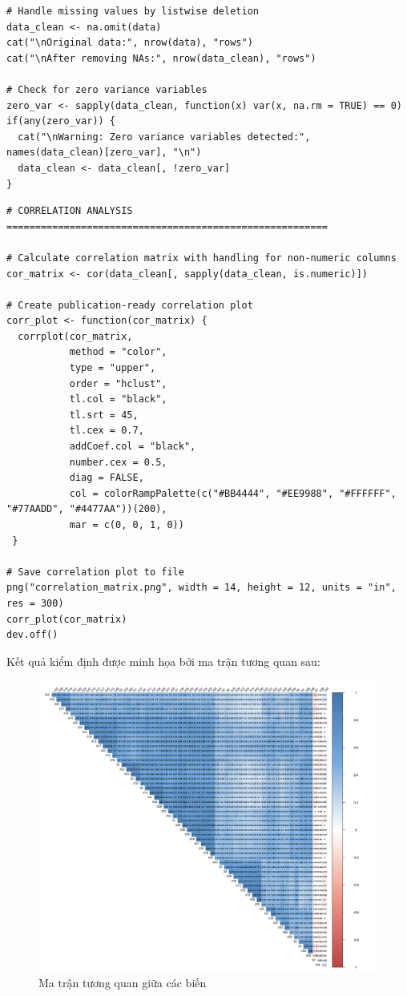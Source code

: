 \begin{lstlisting}[style=Rstyle, caption={Đọc dữ liệu vào để tiến hành phân tích dữ liệu}]
# Handle missing values by listwise deletion
data_clean <- na.omit(data)
cat("\nOriginal data:", nrow(data), "rows")
cat("\nAfter removing NAs:", nrow(data_clean), "rows")

# Check for zero variance variables
zero_var <- sapply(data_clean, function(x) var(x, na.rm = TRUE) == 0)
if(any(zero_var)) {
  cat("\nWarning: Zero variance variables detected:", names(data_clean)[zero_var], "\n")
  data_clean <- data_clean[, !zero_var]
}
\end{lstlisting}

\begin{lstlisting}[caption={Phân tích tương quan giữa các biến}]
# CORRELATION ANALYSIS ========================================================

# Calculate correlation matrix with handling for non-numeric columns
cor_matrix <- cor(data_clean[, sapply(data_clean, is.numeric)])

# Create publication-ready correlation plot
corr_plot <- function(cor_matrix) {
  corrplot(cor_matrix, 
           method = "color", 
           type = "upper",
           order = "hclust",
           tl.col = "black", 
           tl.srt = 45,
           tl.cex = 0.7,
           addCoef.col = "black",
           number.cex = 0.5,
           diag = FALSE,
           col = colorRampPalette(c("#BB4444", "#EE9988", "#FFFFFF", "#77AADD", "#4477AA"))(200),
           mar = c(0, 0, 1, 0))
 }

# Save correlation plot to file
png("correlation_matrix.png", width = 14, height = 12, units = "in", res = 300)
corr_plot(cor_matrix)
dev.off()
\end{lstlisting}

Kết quả kiểm định được minh họa bởi ma trận tương quan sau:
\begin{figure}[h!]
    \includegraphics[width=\textwidth]{../../assets/images/correlation_matrix_1.png}
    \caption{Ma trận tương quan giữa các biến}
    \label{fig:correlation_matrix}
\end{figure}

